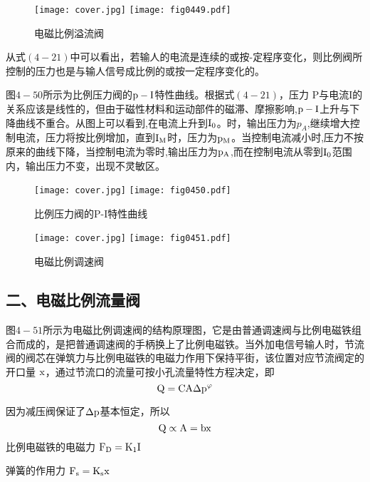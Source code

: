 \begin{figure}[!hbt]
\centering
\ifOpenSource
\texttt{[image: cover.jpg]}
\else
\texttt{[image: fig0449.pdf]}
\fi
\caption{电磁比例溢流阀}
\label{fig:fig0449}
\end{figure}

从式$(4-21)$中可以看出，若输人的电流是连续的或按-定程序变化，则比例阀所控制的压力也是与输人信号成比例的或按一定程序变化的。

图$4-50$所示为比例压力阀的$\rm p-I$特性曲线。根据式$(4-21)$，压力 P与电流I的关系应该是线性的，但由于磁性材料和运动部件的磁滞、摩擦影响,$\rm p-I$上升与下降曲线不重合。从图上可以看到,在电流上升到$\rm I_0$。时，输出压力为$p_A$,继续增大控制电流，压力将按比例增加，直到$\rm I_M$时，压力为$\rm p_M$。当控制电流减小时,压力不按原来的曲线下降，当控制电流为零时,输出压力为$\rm p_A$,而在控制电流从零到$\rm I_0$范围内，输出压力不变，出现不灵敏区。

\begin{figure}[!hbt]
\centering
\ifOpenSource
\texttt{[image: cover.jpg]}
\else
\texttt{[image: fig0450.pdf]}
\fi
\caption{比例压力阀的P-I特性曲线}
\label{fig:fig0450}
\end{figure}

\begin{figure}[!hbt]
\centering
\ifOpenSource
\texttt{[image: cover.jpg]}
\else
\texttt{[image: fig0451.pdf]}
\fi
\caption{电磁比例调速阀}
\label{fig:fig0451}
\end{figure}

\subsection{二、电磁比例流量阀}

图$4-51$所示为电磁比例调速阀的结构原理图，它是由普通调速阀与比例电磁铁组合而成的，是把普通调速阀的手柄换上了比例电磁铁。当外加电信号输人时，节流阀的阀芯在弹筑力与比例电磁铁的电磁力作用下保持平街，该位置对应节流阀定的开口量 $\rm x$，通过节流口的流量可按小孔流量特性方程决定，即
$$\rm Q=CA\Delta p^\varphi$$

因为减压阀保证了$\rm \Delta p$基本恒定，所以 \vspace{-0.1cm}
\begin{equation}
\rm Q\propto A=bx
\end{equation}
比例电磁铁的电磁力  \hspace{2.3cm} $\rm F_D=K_1I$

弹簧的作用力 \hspace{3.4cm} $\rm F_s=K_s x$

